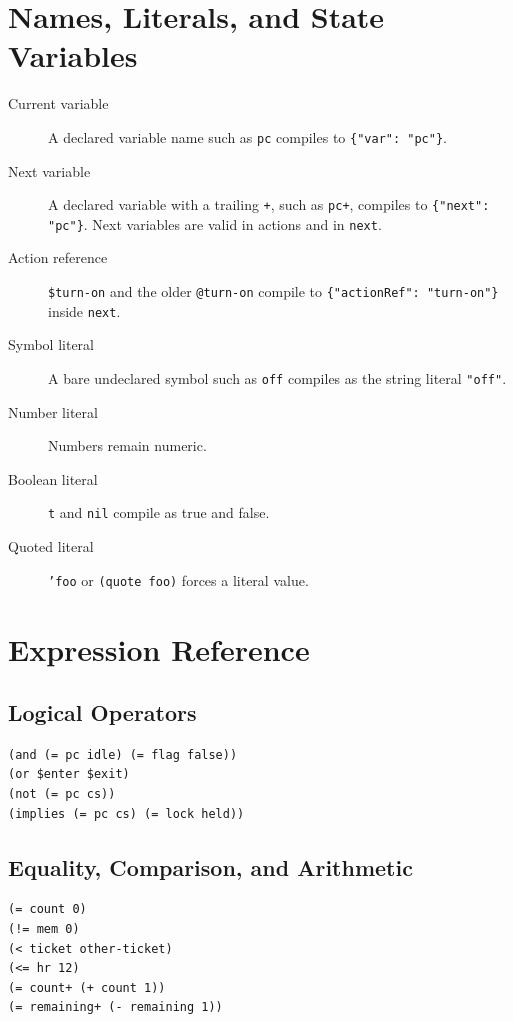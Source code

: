 \documentclass[11pt]{article}
\begin{document}
\section{Names, Literals, and State Variables}

\begin{description}
\item[Current variable] A declared variable name such as \texttt{pc} compiles to
  \texttt{\{"var": "pc"\}}.
\item[Next variable] A declared variable with a trailing \texttt{+}, such as
  \texttt{pc+}, compiles to \texttt{\{"next": "pc"\}}.  Next variables are
  valid in actions and in \texttt{next}.
\item[Action reference] \texttt{\$turn-on} and the older \texttt{@turn-on}
  compile to \texttt{\{"actionRef": "turn-on"\}} inside \texttt{next}.
\item[Symbol literal] A bare undeclared symbol such as \texttt{off} compiles as
  the string literal \texttt{"off"}.
\item[Number literal] Numbers remain numeric.
\item[Boolean literal] \texttt{t} and \texttt{nil} compile as true and false.
\item[Quoted literal] \texttt{'foo} or \texttt{(quote foo)} forces a literal
  value.
\end{description}

\section{Expression Reference}

\subsection{Logical Operators}

\begin{lstlisting}[language=DSTR]
(and (= pc idle) (= flag false))
(or $enter $exit)
(not (= pc cs))
(implies (= pc cs) (= lock held))
\end{lstlisting}

\subsection{Equality, Comparison, and Arithmetic}

\begin{lstlisting}[language=DSTR]
(= count 0)
(!= mem 0)
(< ticket other-ticket)
(<= hr 12)
(= count+ (+ count 1))
(= remaining+ (- remaining 1))
\end{lstlisting}
\end{document}
